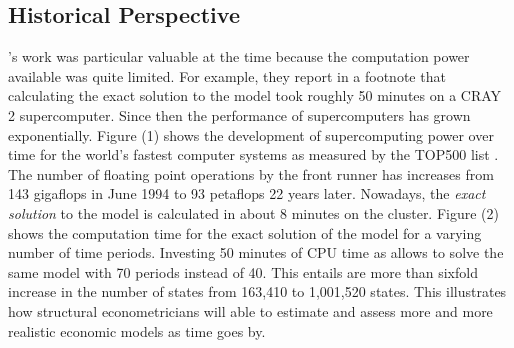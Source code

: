 \subsection{Historical Perspective}\label{Appendix: Historical Perspective}
 \citet{Keane.1994}'s work was particular valuable at the time because the computation power available was quite limited. For example, they report in a footnote that calculating the exact solution to the model took roughly 50 minutes on a CRAY 2 supercomputer. Since then the performance of supercomputers has grown exponentially. Figure (1) shows the development of supercomputing power over time for the world's fastest computer systems as measured by the TOP500 list \citep{TOP500.2017}. The number of floating point operations by the front runner has increases from 143 gigaflops in June 1994 to 93 petaflops 22 years later. Nowadays, the \textit{exact solution} to the model is calculated in about 8 minutes on the  cluster. Figure (2) shows the computation time for the exact solution of the model for a varying number of time periods. Investing 50 minutes of CPU time as allows to solve the same model with 70 periods instead of 40. This entails are more than sixfold increase in the number of states from 163,410 to 1,001,520 states. This illustrates how structural econometricians will able to estimate and assess more and more realistic economic models as time goes by.
